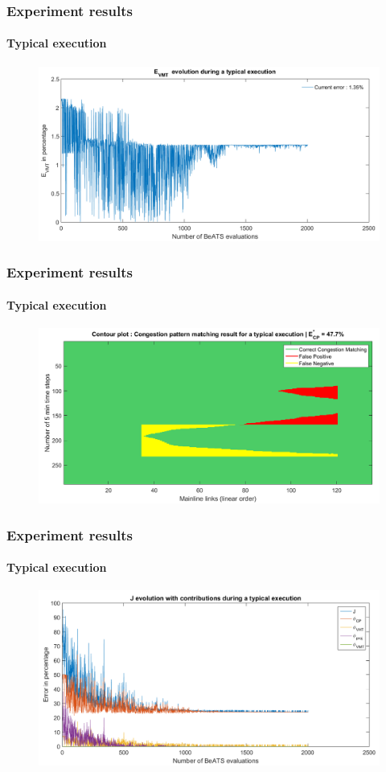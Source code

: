 \documentclass[fleqn]{beamer}
\begin{document}
\begin{frame}
	\frametitle{Experiment results}
	\framesubtitle{Typical execution}
	\begin{figure}
		\centering
		\includegraphics[width=4.5in]{figures/results_figures/VMTexample.png}
	\end{figure}
\end{frame}

\begin{frame}
	\frametitle{Experiment results}
	\framesubtitle{Typical execution}
	\begin{figure}
		\centering
		\includegraphics[width=4.5in]{figures/results_figures/typicalcpexample.png}
	\end{figure}
\end{frame}

\begin{frame}
	\frametitle{Experiment results}
	\framesubtitle{Typical execution}
	\begin{figure}
		\centering
		\includegraphics[width=4.5in]{figures/results_figures/contributionsexample.png}
	\end{figure}
\end{frame}
\end{document}

